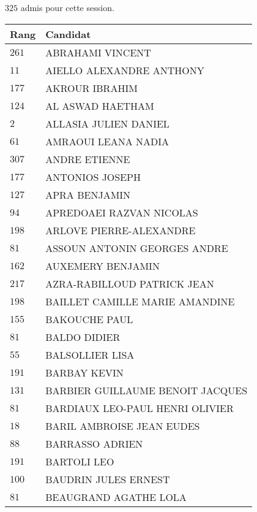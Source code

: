 




  $325$ admis pour cette session.

  \begin{xltabular}{\linewidth}{|l|X|}
    \hline
    \textbf{Rang} & \textbf{Candidat} \\
    \hline
    $261$ & ABRAHAMI VINCENT \\
    \hline
    $11$ & AIELLO ALEXANDRE ANTHONY \\
    \hline
    $177$ & AKROUR IBRAHIM \\
    \hline
    $124$ & AL ASWAD HAETHAM \\
    \hline
    $2$ & ALLASIA JULIEN DANIEL \\
    \hline
    $61$ & AMRAOUI LEANA NADIA \\
    \hline
    $307$ & ANDRE ETIENNE \\
    \hline
    $177$ & ANTONIOS JOSEPH \\
    \hline
    $127$ & APRA BENJAMIN \\
    \hline
    $94$ & APREDOAEI RAZVAN NICOLAS \\
    \hline
    $198$ & ARLOVE PIERRE-ALEXANDRE \\
    \hline
    $81$ & ASSOUN ANTONIN GEORGES ANDRE \\
    \hline
    $162$ & AUXEMERY BENJAMIN \\
    \hline
    $217$ & AZRA-RABILLOUD PATRICK JEAN \\
    \hline
    $198$ & BAILLET CAMILLE MARIE AMANDINE \\
    \hline
    $155$ & BAKOUCHE PAUL \\
    \hline
    $81$ & BALDO DIDIER \\
    \hline
    $55$ & BALSOLLIER LISA \\
    \hline
    $191$ & BARBAY KEVIN \\
    \hline
    $131$ & BARBIER GUILLAUME BENOIT JACQUES \\
    \hline
    $81$ & BARDIAUX LEO-PAUL HENRI OLIVIER \\
    \hline
    $18$ & BARIL AMBROISE JEAN EUDES \\
    \hline
    $88$ & BARRASSO ADRIEN \\
    \hline
    $191$ & BARTOLI LEO \\
    \hline
    $100$ & BAUDRIN JULES ERNEST \\
    \hline
    $81$ & BEAUGRAND AGATHE LOLA \\

\end{xltabular}
